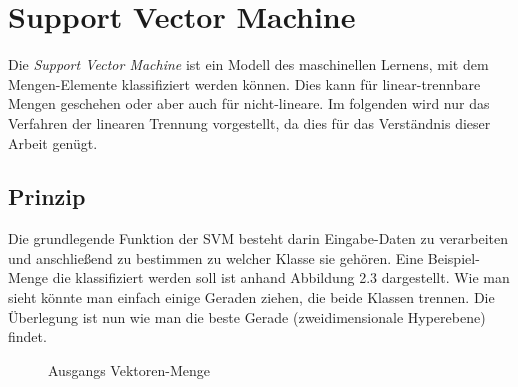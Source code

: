 \section{Support Vector Machine}
\label{sec:grundlagensvm}

Die \emph{Support Vector Machine} ist ein Modell des maschinellen Lernens, mit dem Mengen-Elemente klassifiziert werden können. Dies kann für linear-trennbare Mengen geschehen oder aber auch für nicht-lineare. Im folgenden wird nur das Verfahren der linearen Trennung vorgestellt, da dies für das Verständnis dieser Arbeit genügt.

\subsection{Prinzip}

Die grundlegende Funktion der SVM besteht darin Eingabe-Daten zu verarbeiten und anschließend zu bestimmen zu welcher Klasse sie gehören. Eine Beispiel-Menge die klassifiziert werden soll ist anhand Abbildung 2.3 dargestellt. Wie man sieht könnte man einfach einige Geraden ziehen, die beide Klassen trennen. Die Überlegung ist nun wie man die beste Gerade (zweidimensionale Hyperebene) findet.

\begin{figure}[h!]
\begin{subfigure}[b]{0.45\textwidth}
\centering
{}
\end{subfigure}
\begin{subfigure}[b]{0.45\textwidth}
\end{subfigure}
\caption{Ausgangs Vektoren-Menge}
\label{fig:svm_coordinate_system_start}
\end{figure}

